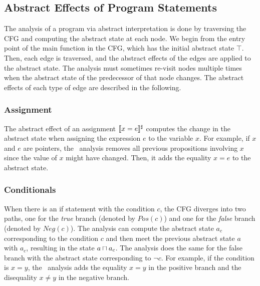 \subsection{Abstract Effects of Program Statements}
The analysis of a program via abstract interpretation is done by traversing the CFG and computing the abstract state at each node.
We begin from the entry point of the \textsf{main} function in the CFG, which has the initial abstract state $\top$.
Then, each edge is traversed, and the abstract effects of the edges are applied to the abstract state.
The analysis must sometimes re-visit nodes multiple times when the abstract state of the predecessor of that node changes.
The abstract effects of each type of edge are described in the following.

\subsubsection{Assignment}
The abstract effect of an assignment $\llbracket x = e\rrbracket^\sharp$ computes the change in the abstract state when assigning the expression $e$ to the variable $x$.
For example, if $x$ and $e$ are pointers, the \cpo\ analysis removes all previous propositions involving $x$ since the value of $x$ might have changed.
Then, it adds the equality $x = e$ to the abstract state.
\subsubsection{Conditionals}
When there is an \textsf{if} statement with the condition $c$, the CFG diverges into two paths, one for the \emph{true} branch (denoted by $Pos(c)$) and one for the \emph{false} branch (denoted by $Neg(c)$).
The analysis can compute the abstract state $a_c$ corresponding to the condition $c$ and then meet the previous abstract state $a$ with $a_c$, resulting in the state $a \sqcap a_c$.
The analysis does the same for the false branch with the abstract state corresponding to $\neg c$.
For example, if the condition is $x = y$, the \cpo\ analysis adds the equality $x = y$ in the positive branch and the disequality $x \neq y$ in the negative branch.
